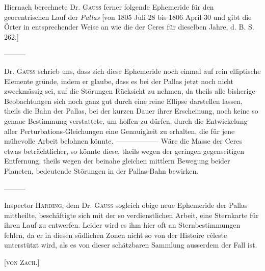 \indent Hiernach berechnete Dr. \textsc{Gauss} ferner folgende Ephemeride für den geocentrischen Lauf der \emph{Pallas} [von 1805 Juli 28 bis 1806 April 30 und gibt die Örter in entsprechender Weise an wie die der Ceres für dieselben Jahre, d. B. S. 262.]

—\quad—\quad—

Dr. \textsc{Gauss} schrieb uns, dass sich diese Ephemeride noch einmal auf rein elliptische Elemente gründe, indem er glaube, dass es bei der Pallas jetzt noch nicht zweckmässig sei, auf die Störungen Rücksicht zu nehmen, da theils alle bisherige Beobachtungen sich noch ganz gut durch eine reine Ellipse darstellen lassen, theils die Bahn der Pallas, bei der kurzen Dauer ihrer Erscheinung, noch keine so genaue Bestimmung verstattete, um hoffen zu dürfen, durch die Entwickelung aller Perturbations-Gleichungen eine Genauigkeit zu erhalten, die für jene mühevolle Arbeit belohnen könnte. —\quad—\quad—\quad—\quad—\quad— Wäre die Masse der Ceres etwas beträchtlicher, so könnte diese, theils wegen der geringen gegenseitigen Entfernung, theils wegen der beinahe gleichen mittlern Bewegung beider Planeten, bedeutende Störungen in der Pallas-Bahn bewirken.

—\quad—\quad—

Inspector \textsc{Harding}, dem Dr. \textsc{Gauss} sogleich obige neue Ephemeride der Pallas mittheilte, beschäftigte sich mit der so verdienstlichen Arbeit, eine Sternkarte für ihren Lauf zu entwerfen. Leider wird es ihm hier oft an Sternbestimmungen fehlen, da er in diesen südlichen Zonen nicht so von der Histoire céleste unterstützt wird, als es von dieser schätzbaren Sammlung ausserdem der Fall ist.

\hfill[\textsc{von Zach.}]

